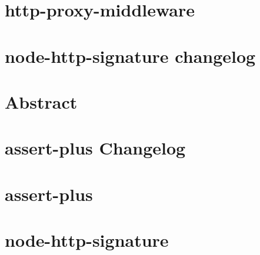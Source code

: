 \documentclass[twoside]{book}
\newcommand{\+}{\discretionary{\mbox{\scriptsize$\hookleftarrow$}}{}{}}
\begin{document}
\chapter{http-\/proxy-\/middleware}
\label{md__c_1_workspace_demo_src_main_script_node_modules_http-proxy-middleware__r_e_a_d_m_e}

\chapter{node-\/http-\/signature changelog}
\label{md__c_1_workspace_demo_src_main_script_node_modules_http-signature__c_h_a_n_g_e_s}

\chapter{Abstract}
\label{md__c_1_workspace_demo_src_main_script_node_modules_http-signature_http_signing}

\chapter{assert-\/plus Changelog}
\label{md__c_1_workspace_demo_src_main_script_node_modules_http-signature_node_modules_assert-plus__c_h_a_n_g_e_s}

\chapter{assert-\/plus}
\label{md__c_1_workspace_demo_src_main_script_node_modules_http-signature_node_modules_assert-plus__r_e_a_d_m_e}

\chapter{node-\/http-\/signature}
\label{md__c_1_workspace_demo_src_main_script_node_modules_http-signature__r_e_a_d_m_e}

\end{document}
